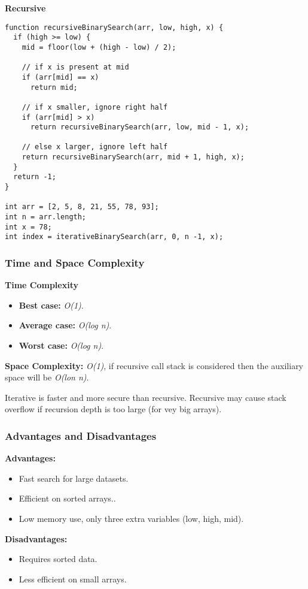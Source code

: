 \textbf{Recursive}

\begin{lstlisting}[style=general]
function recursiveBinarySearch(arr, low, high, x) {
  if (high >= low) {
    mid = floor(low + (high - low) / 2);

    // if x is present at mid
    if (arr[mid] == x)
      return mid;

    // if x smaller, ignore right half
    if (arr[mid] > x)
      return recursiveBinarySearch(arr, low, mid - 1, x);

    // else x larger, ignore left half
    return recursiveBinarySearch(arr, mid + 1, high, x);
  }
  return -1;
}

int arr = [2, 5, 8, 21, 55, 78, 93];
int n = arr.length;
int x = 78;
int index = iterativeBinarySearch(arr, 0, n -1, x);
\end{lstlisting}

\subsubsection*{Time and Space Complexity}

\textbf{Time Complexity}

\begin{itemize}
  \item \textbf{Best case:} \textit{O(1)}.
  \item \textbf{Average case:} \emph{O(log n)}.
  \item \textbf{Worst case:} \textit{O(log n)}.
\end{itemize}

\textbf{Space Complexity:} \textit{O(1)}, if recursive call stack is considered then the auxiliary space will be \textit{O(lon n)}.

Iterative is faster and more secure than recursive. Recursive may cause stack overflow if recursion depth is too large (for vey big arrays).

\subsubsection*{Advantages and Disadvantages}

\textbf{Advantages:}

\begin{itemize}
  \item Fast search for large datasets.
  \item Efficient on sorted arrays..
  \item Low memory use, only three extra variables (low, high, mid).
\end{itemize}

\textbf{Disadvantages:}

\begin{itemize}
  \item Requires sorted data.
  \item Less efficient on small arrays.
\end{itemize}
